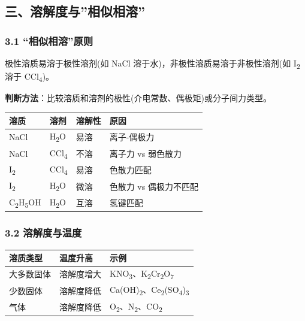 \documentclass[a4paper,11pt]{ctexart}
\newcounter{none}
\newcommand{\箭}{\ensuremath{\rightarrow}}
\newcommand{\左箭}{\ensuremath{\leftarrow}}
\newcommand{\上箭}{\ensuremath{\uparrow}}
\newcommand{\下箭}{\ensuremath{\downarrow}}
\newcommand{\衡}{\ensuremath{\rightleftharpoons}}
\newcommand{\双箭}{\ensuremath{\leftrightarrow}}
\newcommand{\约等于}{\ensuremath{\approx}}
\newcommand{\小于等于}{\ensuremath{\leq}}
\newcommand{\大于等于}{\ensuremath{\geq}}
\newcommand{\不等于}{\ensuremath{\neq}}
\newcommand{\西格马}{\ensuremath{\sigma}}
\newcommand{\派}{\ensuremath{\pi}}
\begin{document}
\subsection{三、溶解度与''相似相溶''}\label{ux4e09ux6eb6ux89e3ux5ea6ux4e0eux76f8ux4f3cux76f8ux6eb6}

\subsubsection{3.1 ``相似相溶''原则}\label{ux76f8ux4f3cux76f8ux6eb6ux539fux5219}

极性溶质易溶于极性溶剂(如 NaCl 溶于水)，非极性溶质易溶于非极性溶剂(如 I\textsubscript{2} 溶于 CCl\textsubscript{4})。

\textbf{判断方法}：比较溶质和溶剂的极性(介电常数、偶极矩)或分子间力类型。

{\def\LTcaptype{none} %
\begin{longtable}[]{@{}llll@{}}
\toprule\noalign{}
溶质 & 溶剂 & 溶解性 & 原因 \\
\midrule\noalign{}
\endhead
\bottomrule\noalign{}
\endlastfoot
NaCl & H\textsubscript{2}O & 易溶 & 离子-偶极力 \\
NaCl & CCl\textsubscript{4} & 不溶 & 离子力 vs 弱色散力 \\
I\textsubscript{2} & CCl\textsubscript{4} & 易溶 & 色散力匹配 \\
I\textsubscript{2} & H\textsubscript{2}O & 微溶 & 色散力 vs 偶极力不匹配 \\
C\textsubscript{2}H\textsubscript{5}OH & H\textsubscript{2}O & 互溶 & 氢键匹配 \\
\end{longtable}
}

\subsubsection{3.2 溶解度与温度}\label{ux6eb6ux89e3ux5ea6ux4e0eux6e29ux5ea6}

{\def\LTcaptype{none} %
\begin{longtable}[]{@{}lll@{}}
\toprule\noalign{}
溶质类型 & 温度升高 & 示例 \\
\midrule\noalign{}
\endhead
\bottomrule\noalign{}
\endlastfoot
大多数固体 & 溶解度增大 & KNO\textsubscript{3}、K\textsubscript{2}Cr\textsubscript{2}O\textsubscript{7} \\
少数固体 & 溶解度降低 & Ca(OH)\textsubscript{2}、Ce\textsubscript{2}(SO\textsubscript{4})\textsubscript{3} \\
气体 & 溶解度降低 & O\textsubscript{2}、N\textsubscript{2}、CO\textsubscript{2} \\
\end{longtable}
}
\end{document}
